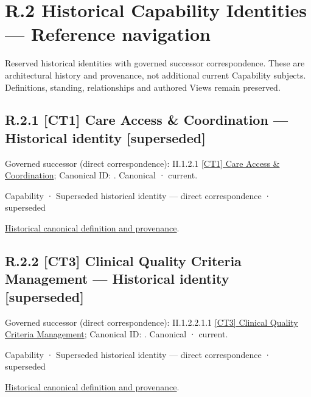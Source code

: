 \chapter*{R.2 Historical Capability Identities — Reference navigation}
\label{navigation:R.2}

Reserved historical identities with governed successor correspondence. These are architectural history and provenance, not additional current Capability subjects. Definitions, standing, relationships and authored Views remain preserved.\par
\section*{R.2.1 [CT1] Care Access \& Coordination — Historical identity [superseded]}
\label{navigation:R.2.1}

{\small Governed successor (direct correspondence): II.1.2.1 \hyperref[element:ed342cb8656b4f80b55ad519ecbd2d3a]{[CT1] Care Access \& Coordination}; Canonical ID: \texttt{}. Canonical · current.}\par
\label{element:0dec07b6ddbe48bda93a2295dd3e2d7d}
{\small Capability · Superseded historical identity — direct correspondence · superseded}\par
\href{../../../../continuum/strategy/capability/0dec07b6ddbe48bda93a2295dd3e2d7d.md}{Historical canonical definition and provenance}.\par
\section*{R.2.2 [CT3] Clinical Quality Criteria Management — Historical identity [superseded]}
\label{navigation:R.2.2}

{\small Governed successor (direct correspondence): II.1.2.2.1.1 \hyperref[element:1f48527a9a7c4382a7f8a660ccb9f29f]{[CT3] Clinical Quality Criteria Management}; Canonical ID: \texttt{}. Canonical · current.}\par
\label{element:7a51321b00464016920976b269981edd}
{\small Capability · Superseded historical identity — direct correspondence · superseded}\par
\href{../../../../continuum/strategy/capability/7a51321b00464016920976b269981edd.md}{Historical canonical definition and provenance}.\par
